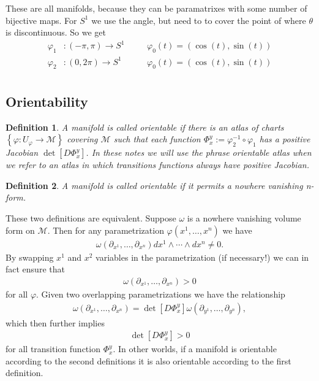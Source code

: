 \documentclass[10pt]{amsart}
\newtheorem{definition}{Definition}[section]
\newcommand{\px}[1]{\partial_{x^{#1}}}
\newcommand{\py}[1]{\partial_{y^{#1}}}
\newcommand{\ra}{\rightarrow}
\newcommand{\M}{\mathcal{M}}
\newcommand{\vp}{\varphi}
\renewcommand{\o}{\circ}
\renewcommand{\i}{^{-1}}
\newcommand{\wfb}{dx^1\wedge\cdots\wedge dx^n}
\renewcommand{\*}{\star}
\begin{document}
These are all manifolds, because they can be paramatrixes with some number of
bijective maps. For $S^1$ we use the angle, but need to to cover the point of
where $\theta$ is discontinuous. So we get
\begin{align*}
  \vp_1&:(-\pi,\pi)\ra S^1&\quad&\vp_0(t)=(\cos(t),\sin(t))\\
  \vp_2&:(0,2\pi)\ra S^1&\quad&\vp_0(t)=(\cos(t),\sin(t))\\
\end{align*}

\subsection{Orientability}%
\label{sub:orientability}

\begin{definition}
  A manifold is called orientable if there is an atlas of charts
  $\left\{\vp:U_\vp\ra\M\right\}$ covering $\M$ such that each function
  $\Phi_x^y:=\vp_2\i\o\vp_1$ has a positive Jacobian
  $\det\left[D\Phi_x^y\right]$. In these notes we will use the phrase
  orientable atlas when we refer to an atlas in which transitions functions
  always have positive Jacobian.
\end{definition}

\begin{definition}
   A manifold is called orientable if it permits a nowhere vanishing n-form.
\end{definition}

These two definitions are equivalent. Suppose $\omega$ is a nowhere vanishing
volume form on $\M$. Then for any parametrization $\vp(x^1,\ldots,x^n)$ we have
\begin{align*}
  \omega(\px{1},\ldots,\px{n})\wfb\neq 0.
\end{align*}
By swapping $x^1$ and $x^2$ variables in the parametrization (if necessary!) we
can in fact ensure that
\begin{align*}
  \omega(\px{1},\ldots,\px{n})>0
\end{align*}
for all $\vp$. Given two overlapping parametrizations we have the relationship
\begin{align*}
  \omega(\px{1},\ldots,\px{n})=\det\left[D\Phi_x^y\right]\omega(\py{1},\ldots,\py{n}),
\end{align*}
which then further implies
\begin{align*}
  \det\left[D\Phi_x^y\right]>0
\end{align*}
for all transition function $\Phi_x^y$. In other worlds, if a manifold is
orientable according to the second definitions it is also orientable according
to the first definition.
\end{document}
